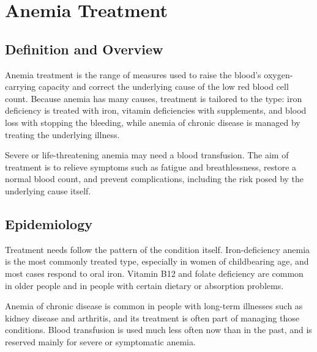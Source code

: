 \chapter{Anemia Treatment}

\section*{Definition and Overview}
Anemia treatment is the range of measures used to raise the blood's oxygen-carrying capacity and correct the underlying cause of the low red blood cell count. Because anemia has many causes, treatment is tailored to the type: iron deficiency is treated with iron, vitamin deficiencies with supplements, and blood loss with stopping the bleeding, while anemia of chronic disease is managed by treating the underlying illness.

Severe or life-threatening anemia may need a blood transfusion. The aim of treatment is to relieve symptoms such as fatigue and breathlessness, restore a normal blood count, and prevent complications, including the risk posed by the underlying cause itself.

\section*{Epidemiology}
Treatment needs follow the pattern of the condition itself. Iron-deficiency anemia is the most commonly treated type, especially in women of childbearing age, and most cases respond to oral iron. Vitamin B12 and folate deficiency are common in older people and in people with certain dietary or absorption problems.

Anemia of chronic disease is common in people with long-term illnesses such as kidney disease and arthritis, and its treatment is often part of managing those conditions. Blood transfusion is used much less often now than in the past, and is reserved mainly for severe or symptomatic anemia.

